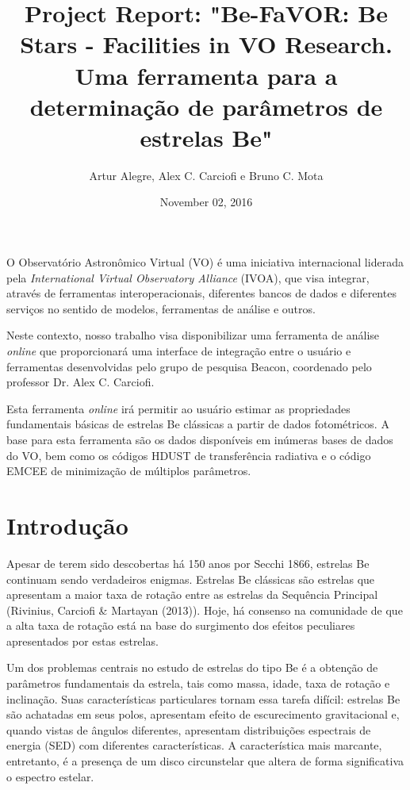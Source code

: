 \documentclass[letterpaper,10pt,english]{sphinxmanual}
\title{Project Report: "Be-FaVOR: Be Stars - Facilities in VO Research. Uma ferramenta para a determinação de parâmetros de estrelas Be"}
\date{November 02, 2016}
\author{Artur Alegre, Alex C. Carciofi e Bruno C. Mota}
\begin{document}
\maketitle
\tableofcontents
{}\label{index::doc}


O Observatório Astronômico Virtual (VO) é uma iniciativa internacional liderada pela \emph{International Virtual Observatory Alliance} (IVOA), que visa integrar, através de ferramentas interoperacionais, diferentes bancos de dados e diferentes serviços no sentido de modelos, ferramentas de análise e outros.

Neste contexto, nosso trabalho visa disponibilizar uma ferramenta de análise \emph{online} que proporcionará uma interface de integração entre o usuário e ferramentas desenvolvidas pelo grupo de pesquisa Beacon, coordenado pelo professor Dr. Alex C. Carciofi.

Esta ferramenta \emph{online} irá permitir ao usuário estimar as propriedades fundamentais básicas de estrelas Be clássicas a partir de dados fotométricos. A base para esta ferramenta são os dados disponíveis em inúmeras bases de dados do VO, bem como os códigos HDUST de transferência radiativa e o código EMCEE de minimização de múltiplos parâmetros.


\chapter{Introdução}
\label{index:introducao}\label{index:project-report-be-favor-be-stars-facilities-in-vo-research-uma-ferramenta-para-a-determinacao-de-parametros-de-estrelas-be}
Apesar de terem sido descobertas há 150 anos por Secchi 1866, estrelas Be continuam sendo verdadeiros enigmas. Estrelas Be clássicas são estrelas que apresentam a maior taxa de rotação entre as estrelas da Sequência Principal (Rivinius, Carciofi \& Martayan (2013)). Hoje, há consenso na comunidade de que a alta taxa de rotação está na base do surgimento dos efeitos peculiares apresentados por estas estrelas.

Um dos problemas centrais no estudo de estrelas do tipo Be é a obtenção de parâmetros fundamentais da estrela, tais como massa, idade, taxa de rotação e inclinação. Suas características particulares tornam essa tarefa difícil: estrelas Be são achatadas em seus polos, apresentam efeito de escurecimento gravitacional e, quando vistas de ângulos diferentes, apresentam distribuições espectrais de energia (SED) com diferentes características. A característica mais marcante, entretanto, é a presença de um disco circunstelar que altera de forma significativa o espectro estelar.
\end{document}
